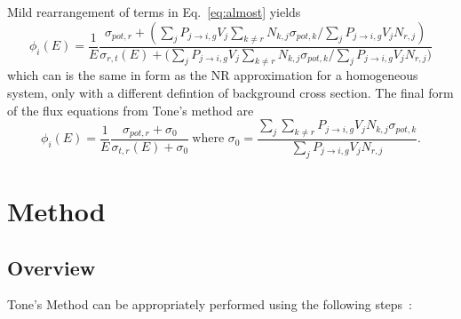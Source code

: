 \documentclass[10pt]{article}
\begin{document}
Mild rearrangement of terms in Eq.~\ref{eq:almost} yields
\begin{equation}\phi_{i}(E)=\frac{1}{E}\frac{\sigma_{pot,r}+\left(\sum\limits_jP_{j\rightarrow i,g}V_{j}\sum\limits_{k\neq r}N_{k,j}\sigma_{pot,k}\Big/\sum\limits_jP_{j\rightarrow i,g}V_{j}N_{r,j}\right)}{\sigma_{r,t}(E)+\Big(\sum\limits_{j}P_{j\rightarrow i,g}V_{j}\sum\limits_{k\neq r}N_{k,j}\sigma_{pot,k}\Big/\sum\limits_{j}P_{j\rightarrow i,g}V_{j}N_{r,j}\Big)}\end{equation}
which can is the same in form as the NR approximation for a homogeneous system, only with a different defintion of background cross section. The final form of the flux equations from Tone's method are
\begin{equation}\boxed{\phi_i(E)=\frac{1}{E}\frac{\sigma_{pot,r}+\sigma_{0}}{\sigma_{t,r}(E)+\sigma_{0}}~\mbox{where }\sigma_{0}=\frac{\sum\limits_j\sum\limits_{k\neq r}P_{j\rightarrow i,g}V_{j}N_{k,j}\sigma_{pot,k}}{\sum\limits_jP_{j\rightarrow i,g}V_{j}N_{r,j}}.}\label{eq:Tones}\end{equation}





\section{Method}



\subsection{Overview}\label{recipe}
Tone's Method can be appropriately performed using the following steps~\cite{ch9}:
\end{document}
